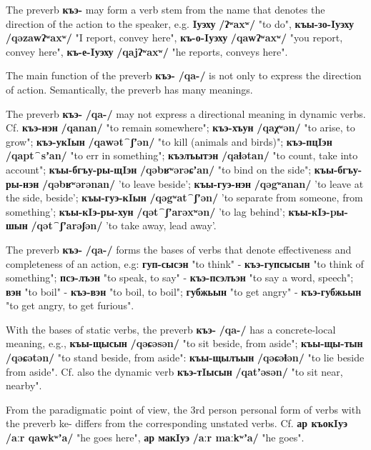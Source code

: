 \documentclass[a4paper,12pt]{book}
\newcommand{\1}[1]{\textbf{\emph{#1}}} %
\newcommand{\2}[1]{\textbf{[#1]}} %
\newcommand{\3}[1]{\fontsize{11pt}{0cm}\textbf{\emph{#1}}} %
\newcommand{\4}[1]{\fontsize{10pt}{0cm}\emph{#1}}	%
\newcommand{\5}[1]{\textbf{/#1/}} %
\newcommand{\6}[1]{\textbf{[#1]}} %
\newcommand{\7}[1]{\fontsize{12pt}{0cm}\emph{#1}} %
\newcommand{\8}[1]{\fontsize{12pt}{0cm}`#1'} %
\newcommand{\9}[1]{\fontsize{12pt}{0cm}(lit. `#1')} %
\newcommand{\glossphonemics}[1]{\textbf{/#1/}} %
\begin{document}
The preverb \textbf{къэ-} may form a verb stem from the name that denotes the direction of the action to the speaker, e.g. \textbf{Iуэху} \glossphonemics{ʔʷaxʷ} "to do", \textbf{къы-зо-Iуэху} \glossphonemics{qəzawʔʷaxʷ} "I report, convey here", \textbf{къ-о-Iуэху} \glossphonemics{qawʔʷaxʷ} "you report, convey here", \textbf{къ-е-Iуэху} \glossphonemics{qajʔʷaxʷ} "he reports, conveys here".

The main function of the preverb \textbf{къэ-} \glossphonemics{qa-} is not only to express the direction of action. Semantically, the preverb has many meanings.

The preverb \textbf{къэ-} \glossphonemics{qa-} may not express a directional meaning in dynamic verbs. Cf. \textbf{къэ-нэн} \glossphonemics{qanan} "to remain somewhere"; \textbf{къэ-хъун} \glossphonemics{qaχʷən} "to arise, to grow"; \textbf{къэ-укIын} \glossphonemics{qawət⁀ʃʼən} "to kill (animals and birds)"; \textbf{къэ-пцIэн} \glossphonemics{qapt⁀sʼan} "to err in something"; \textbf{къэлъытэн} \glossphonemics{qaɬətan} "to count, take into account"; \textbf{къы-бгъу-ры-щIэн} \glossphonemics{qəbʁʷərəɕʼan} "to bind on the side"; \textbf{къы-бгъу-ры-нэн} \glossphonemics{qəbʁʷərənan} 'to leave beside'; \textbf{къы-гуэ-нэн} \glossphonemics{qəgʷanan} 'to leave at the side, beside'; \textbf{къы-гуэ-кIын} \glossphonemics{qəgʷat⁀ʃʼən} 'to separate from someone, from something'; \textbf{къы-кIэ-ры-хун} \glossphonemics{qət⁀ʃʼarəxʷən} 'to lag behind'; \textbf{къы-кIэ-pы-шын} \glossphonemics{qət⁀ʃʼarəʃən} 'to take away, lead away'.

The preverb \textbf{къэ-} \glossphonemics{qa-} forms the bases of verbs that denote effectiveness and completeness of an action, e.g: \textbf{гуп-сысэн} "to think" - \textbf{къэ-гупсысын} "to think of something"; \textbf{псэ-лъэн} "to speak, to say" - \textbf{къэ-псэлъэн} "to say a word, speech"; \textbf{вэн} "to boil" - \textbf{къэ-вэн} "to boil, to boil"; \textbf{губжьын} "to get angry" - \textbf{къэ-губжьын} "to get angry, to get furious".

With the bases of static verbs, the preverb \textbf{къэ-} \glossphonemics{qa-} has a concrete-local meaning, e.g., \textbf{къы-щысын} \glossphonemics{qəɕəsən} "to sit beside, from aside"; \textbf{къы-щы-тын} \glossphonemics{qəɕətən} "to stand beside, from aside": \textbf{къы-щылъын} \glossphonemics{qəɕəɬən} "to lie beside from aside". Cf. also the dynamic verb \textbf{къэ-тIысын} \glossphonemics{qatʼəsən} "to sit near, nearby".

From the paradigmatic point of view, the 3rd person personal form of verbs with the preverb ke- differs from the corresponding unstated verbs. Cf. \textbf{ар къокIуэ} \glossphonemics{aːr qawkʷʼa} "he goes here", \textbf{ар макIуэ} \glossphonemics{aːr maːkʷʼa} "he goes".
\end{document}
